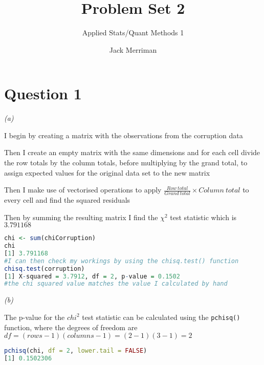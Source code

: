 \documentclass[12pt,letterpaper]{article}
\title{Problem Set 2}
\date{Jack Merriman}
\author{Applied Stats/Quant Methods 1}
\begin{document}
	\maketitle
	
\section*{Question 1}

\textit{(a)}\\ 

\vspace{.25cm}

\noindent I begin by creating a matrix with the observations from the corruption data

 

\noindent Then I create an empty matrix with the same dimensions and for each cell divide the row totals by the column totals, before multiplying by the grand total, to assign expected values for the original data set to the new matrix

 

\noindent Then I make use of vectorised operations to apply $\frac{Row \: total}{Grand \: total} \times Column \: total$ to every cell and find the squared residuals

 

\noindent Then by summing the resulting matrix I find the $\chi^2$ test statistic which is $3.791168$

\begin{lstlisting}[language=R]
chi <- sum(chiCorruption)
chi
[1] 3.791168
#I can then check my workings by using the chisq.test() function
chisq.test(corruption)
[1]	X-squared = 3.7912, df = 2, p-value = 0.1502
#the chi squared value matches the value I calculated by hand
\end{lstlisting}

\clearpage

\noindent\textit{(b)}\\ 

\vspace{.25cm}

\noindent The p-value for the $chi^2$ test statistic can be calculated using the \texttt{pchisq()} function, where the degrees of freedom are $df = (rows - 1)(columns - 1) = (2-1)(3-1) = 2$

\begin{lstlisting}[language=R]
pchisq(chi, df = 2, lower.tail = FALSE)
[1] 0.1502306
\end{lstlisting}
\end{document}
